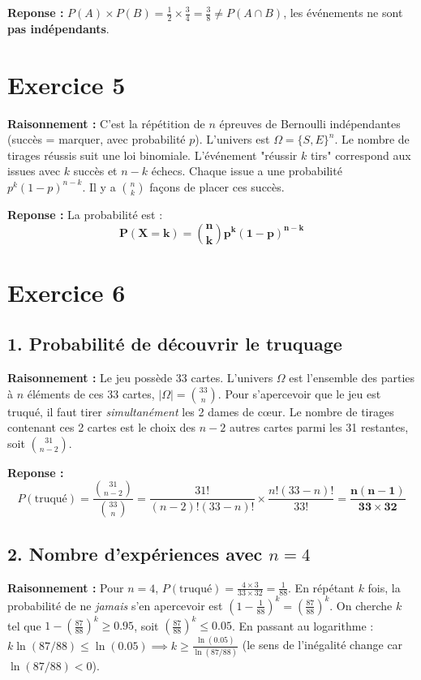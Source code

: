 \documentclass[11pt,a4paper]{article}
\begin{document}
\textbf{Reponse :} $P(A) \times P(B) = \frac{1}{2} \times \frac{3}{4} = \frac{3}{8} \neq P(A \cap B)$, les événements ne sont \textbf{pas indépendants}.

\hrulefill

\section*{Exercice 5}

\textbf{Raisonnement :} C'est la répétition de $n$ épreuves de Bernoulli indépendantes (succès = marquer, avec probabilité $p$). L'univers est $\Omega = \{S, E\}^n$. Le nombre de tirages réussis suit une loi binomiale. L'événement "réussir $k$ tirs" correspond aux issues avec $k$ succès et $n-k$ échecs. Chaque issue a une probabilité $p^k(1-p)^{n-k}$. Il y a $\binom{n}{k}$ façons de placer ces succès.

\textbf{Reponse :} La probabilité est :
$$ \mathbf{P(X=k) = \binom{n}{k}p^k(1-p)^{n-k}} $$

\hrulefill

\section*{Exercice 6}

\subsection*{1. Probabilité de découvrir le truquage}

\textbf{Raisonnement :} Le jeu possède 33 cartes. L'univers $\Omega$ est l'ensemble des parties à $n$ éléments de ces 33 cartes, $|\Omega| = \binom{33}{n}$. Pour s'apercevoir que le jeu est truqué, il faut tirer \textit{simultanément} les 2 dames de cœur. Le nombre de tirages contenant ces 2 cartes est le choix des $n-2$ autres cartes parmi les 31 restantes, soit $\binom{31}{n-2}$.

\textbf{Reponse :} 
$$ P(\text{truqué}) = \frac{\binom{31}{n-2}}{\binom{33}{n}} = \frac{31!}{(n-2)!(33-n)!} \times \frac{n!(33-n)!}{33!} = \mathbf{\frac{n(n-1)}{33 \times 32}} $$

\subsection*{2. Nombre d'expériences avec $n=4$}

\textbf{Raisonnement :} Pour $n=4$, $P(\text{truqué}) = \frac{4 \times 3}{33 \times 32} = \frac{1}{88}$.
En répétant $k$ fois, la probabilité de ne \textit{jamais} s'en apercevoir est $(1 - \frac{1}{88})^k = (\frac{87}{88})^k$.
On cherche $k$ tel que $1 - (\frac{87}{88})^k \ge 0.95$, soit $(\frac{87}{88})^k \le 0.05$.
En passant au logarithme : $k \ln(87/88) \le \ln(0.05) \implies k \ge \frac{\ln(0.05)}{\ln(87/88)}$ (le sens de l'inégalité change car $\ln(87/88) < 0$).
\end{document}

